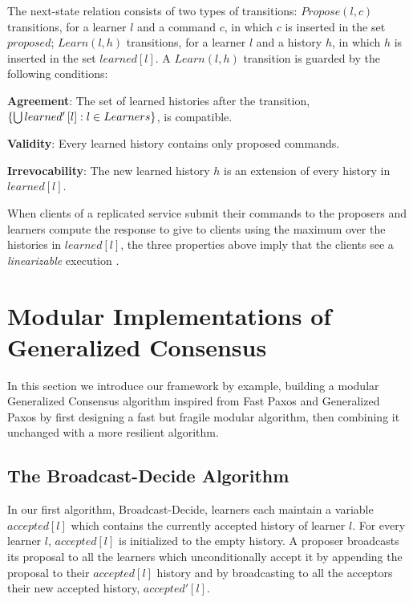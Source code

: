 \documentclass{llncs}
\begin{document}
The next-state relation consists of two types of transitions:
$Propose\left( l, c
\right)$ transitions, for a learner $l$ and a command $c$, in which
$c$ is inserted in the set $proposed$; $Learn\left( l,h \right)$
transitions, for a learner $l$ and a history $h$, in
which $h$ is inserted in the set $learned\left[ l \right]$. 
A $Learn\left( l, h \right)$ transition is guarded by the following conditions:
\begin{compactitem}
    \item[\textbf{Agreement}:] The set of learned histories after the transition, $\left\{\bigcup learned'\left[ l
      \right] : l \in Learners\right\}$, is compatible.
    \item[\textbf{Validity}:] Every learned history contains only
        proposed commands.  
    \item[\textbf{Irrevocability}:] The new learned history
      $h$ is an extension of every history in $learned\left[ l \right]$. 
\end{compactitem}


When clients of a replicated service submit their commands to the proposers and learners compute the response to give to clients using the maximum over the histories in $learned\left[ l \right]$, the three properties above imply that the clients see a \emph{linearizable} execution
\cite{HerlihyWing90LinearizabilityCorrectnessConditionConcurrentObjects}.

\section{Modular Implementations of Generalized Consensus}

In this section we introduce our framework by example, building a modular Generalized Consensus algorithm inspired from Fast Paxos and Generalized Paxos by first designing a fast but fragile modular algorithm, then combining it unchanged with a more resilient algorithm. 

\subsection{The Broadcast-Decide Algorithm}

In our first algorithm, Broadcast-Decide, learners each maintain a variable $accepted\left[ l \right]$ which contains the currently accepted history of learner $l$.
For every learner $l$, $accepted\left[ l \right]$ is initialized to the empty history.
A proposer broadcasts its proposal to all the learners which unconditionally accept it by appending the proposal to their $accepted\left[ l \right]$
history and by broadcasting to all the acceptors their new accepted history, $accepted'\left[ l \right]$.
\end{document}
